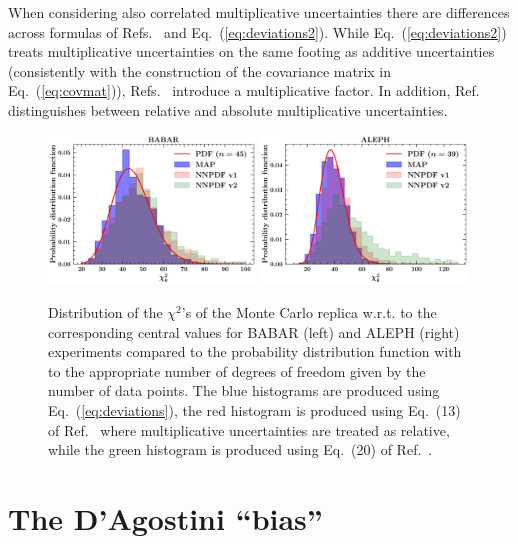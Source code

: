 \documentclass[10pt,a4paper]{article}
\begin{document}
When considering also correlated multiplicative uncertainties there
are differences across formulas of Refs.~\cite{Ball:2008by, Ball:2014uwa} and Eq.~(\ref{eq:deviations2}). While
Eq.~(\ref{eq:deviations2}) treats multiplicative uncertainties on the
same footing as additive uncertainties (consistently with the
construction of the covariance matrix in Eq.~(\ref{eq:covmat})),
Refs.~\cite{Ball:2008by, Ball:2014uwa} introduce a multiplicative
factor. In addition, Ref.~\cite{Ball:2008by} distinguishes between
relative and absolute multiplicative uncertainties.
\begin{figure}[h]
  \begin{centering}
    \includegraphics[width=0.49\textwidth]{plots/Chi2DistBABAR.pdf}
    \includegraphics[width=0.49\textwidth]{plots/Chi2DistALEPH.pdf}
    \caption{Distribution of the $\chi^2$'s of the Monte Carlo replica
      w.r.t. to the corresponding central values for BABAR (left) and
      ALEPH (right) experiments compared to the probability
      distribution function with to the appropriate number of degrees
      of freedom given by the number of data points. The blue
      histograms are produced using Eq.~(\ref{eq:deviations}), the red
      histogram is produced using Eq.~(13) of Ref.~\cite{Ball:2008by}
      where multiplicative uncertainties are treated as relative,
      while the green histogram is produced using Eq.~(20) of
      Ref.~\cite{Ball:2014uwa}. \label{fig:Chi2Dist}}
  \end{centering}
\end{figure}

\section{The D'Agostini ``bias''}
\end{document}
